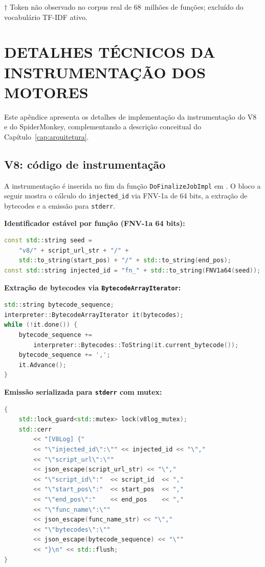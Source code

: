 \noindent\footnotesize{$\dagger$ Token não observado no corpus real de 68~milhões
de funções; excluído do vocabulário TF-IDF ativo.}

\chapter{DETALHES TÉCNICOS DA INSTRUMENTAÇÃO DOS MOTORES}
\label{ap:instrumentacao}

Este apêndice apresenta os detalhes de implementação da instrumentação do V8 e
do SpiderMonkey, complementando a descrição conceitual do
Capítulo~\ref{cap:arquitetura}.

\section{V8: código de instrumentação}
\label{ap:v8-code}

A instrumentação é inserida no fim da função \texttt{DoFinalizeJobImpl} em
. O bloco a seguir mostra o cálculo do
\texttt{injected\_id} via FNV-1a de 64 bits, a extração de bytecodes e a emissão
para \texttt{stderr}.

\textbf{Identificador estável por função (FNV-1a 64 bits):}

\begin{lstlisting}[language=C++]
const std::string seed =
    "v8/" + script_url_str + "/" +
    std::to_string(start_pos) + "/" + std::to_string(end_pos);
const std::string injected_id = "fn_" + std::to_string(FNV1a64(seed));
\end{lstlisting}

\textbf{Extração de bytecodes via \texttt{BytecodeArrayIterator}:}

\begin{lstlisting}[language=C++]
std::string bytecode_sequence;
interpreter::BytecodeArrayIterator it(bytecodes);
while (!it.done()) {
    bytecode_sequence +=
        interpreter::Bytecodes::ToString(it.current_bytecode());
    bytecode_sequence += ',';
    it.Advance();
}
\end{lstlisting}

\textbf{Emissão serializada para \texttt{stderr} com mutex:}

\begin{lstlisting}[language=C++]
{
    std::lock_guard<std::mutex> lock(v8log_mutex);
    std::cerr
        << "[V8Log] {"
        << "\"injected_id\":\"" << injected_id << "\","
        << "\"script_url\":\""
        << json_escape(script_url_str) << "\","
        << "\"script_id\":"  << script_id  << ","
        << "\"start_pos\":"  << start_pos  << ","
        << "\"end_pos\":"    << end_pos    << ","
        << "\"func_name\":\""
        << json_escape(func_name_str) << "\","
        << "\"bytecodes\":\""
        << json_escape(bytecode_sequence) << "\""
        << "}\n" << std::flush;
}
\end{lstlisting}


